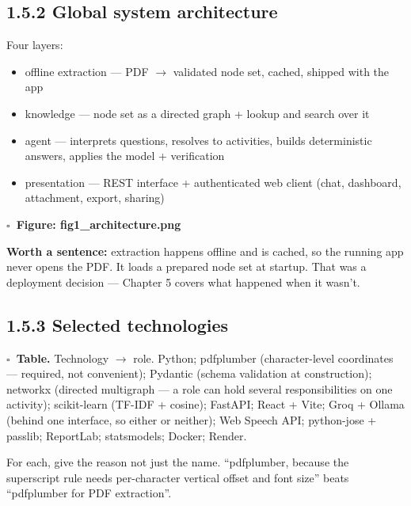 \documentclass[11pt,a4paper]{article}
\newcommand{\todo}{$\square$~}
\begin{document}
\subsection*{1.5.2 Global system architecture}
Four layers:
\begin{itemize}
\item[1.] offline extraction --- PDF $\rightarrow$ validated node set, cached, shipped with the app
\item[2.] knowledge --- node set as a directed graph + lookup and search over it
\item[3.] agent --- interprets questions, resolves to activities, builds deterministic
answers, applies the model + verification
\item[4.] presentation --- REST interface + authenticated web client (chat, dashboard,
attachment, export, sharing)
\end{itemize}
\textbf{\todo Figure: fig1\_architecture.png}

\textbf{Worth a sentence:} extraction happens offline and is cached, so the running
app never opens the PDF. It loads a prepared node set at startup. That was a
deployment decision --- Chapter 5 covers what happened when it wasn't.

\subsection*{1.5.3 Selected technologies}
\textbf{\todo Table.} Technology $\rightarrow$ role. Python; pdfplumber (character-level
coordinates --- required, not convenient); Pydantic (schema validation at construction);
networkx (directed multigraph --- a role can hold several responsibilities on one
activity); scikit-learn (TF-IDF + cosine); FastAPI; React + Vite; Groq + Ollama
(behind one interface, so either or neither); Web Speech API; python-jose + passlib;
ReportLab; statsmodels; Docker; Render.

\textcolor{gr}{\small For each, give the reason not just the name. ``pdfplumber, because
the superscript rule needs per-character vertical offset and font size'' beats
``pdfplumber for PDF extraction''.}

\end{document}
